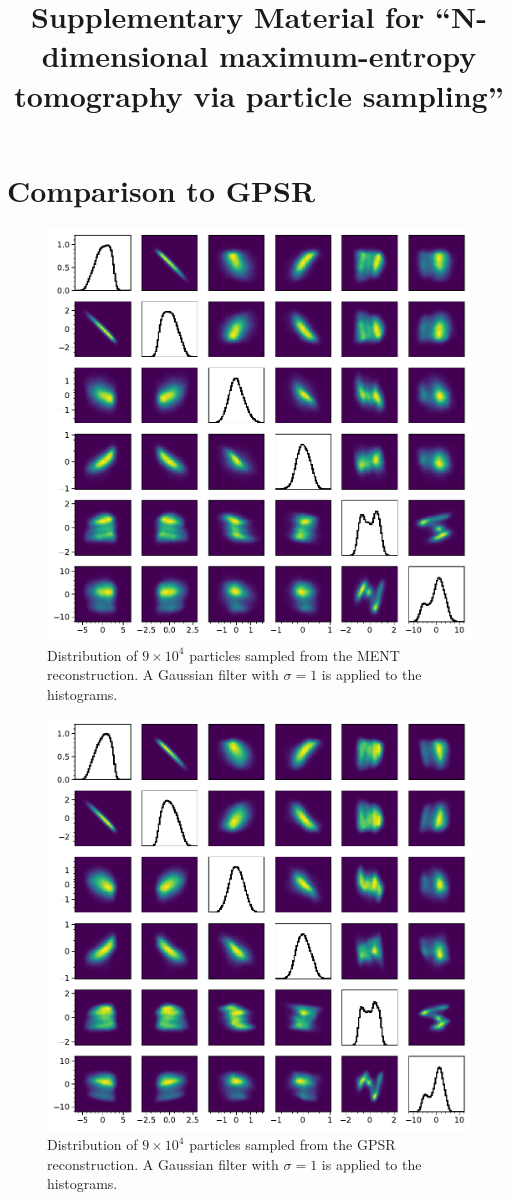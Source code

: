 \documentclass[%
    reprint,
    onecolumn,
    nofootinbib,
    amsmath,
    amssymb,
    aps,
    prstab,
]{revtex4-2}
\begin{document}
\title{Supplementary Material for ``N-dimensional maximum-entropy tomography via particle sampling''}


\maketitle


\section{Comparison to GPSR}

%
\begin{figure}[b]
    \centering
    \includegraphics[width=0.66\linewidth]{fig_ment_corner_samp.pdf}
    \caption{Distribution of $9 \times 10^4$ particles sampled from the MENT reconstruction. A Gaussian filter with $\sigma = 1$ is applied to the histograms.}
\end{figure}
%

%
\begin{figure}[b]
    \centering
    \includegraphics[width=0.66\linewidth]{fig_gpsr_corner_samp.pdf}
    \caption{Distribution of $9 \times 10^4$ particles sampled from the GPSR reconstruction. A Gaussian filter with $\sigma = 1$ is applied to the histograms.}
\end{figure}
%
\end{document}
